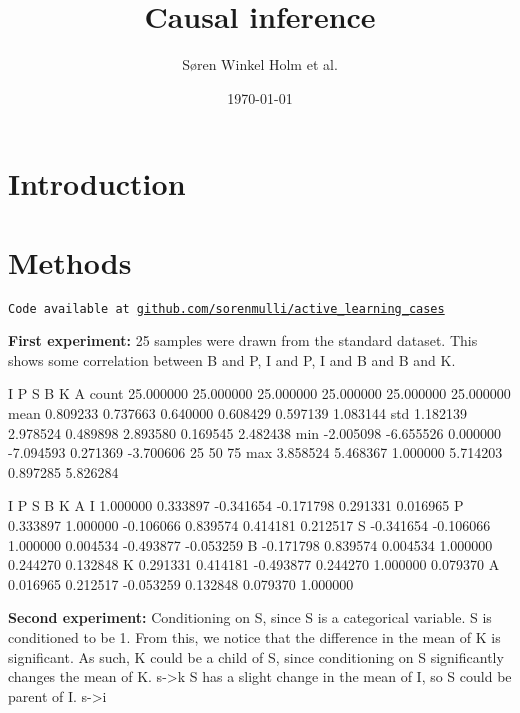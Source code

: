 \documentclass[12pt,fleqn,]{article}
\title{Causal inference }
\author{Søren Winkel Holm et al.}
\date{\today}
\begin{document}
\maketitle

\begin{abstract}

\end{abstract}

\begin{multicols}{2}
	
	
\section{Introduction} 
	
\section{Methods}
\texttt{Code available at \url{github.com/sorenmulli/active_learning_cases}} \newline


\textbf{First experiment:} 25 samples were drawn from the standard dataset. This shows some correlation between B and P, I and P, I and B and B and K.


            I          P          S          B          K          A
count  25.000000  25.000000  25.000000  25.000000  25.000000  25.000000
mean    0.809233   0.737663   0.640000   0.608429   0.597139   1.083144
std     1.182139   2.978524   0.489898   2.893580   0.169545   2.482438
min    -2.005098  -6.655526   0.000000  -7.094593   0.271369  -3.700606
25%
50%
75%
max     3.858524   5.468367   1.000000   5.714203   0.897285   5.826284

       I         P         S         B         K         A
I  1.000000  0.333897 -0.341654 -0.171798  0.291331  0.016965
P  0.333897  1.000000 -0.106066  0.839574  0.414181  0.212517
S -0.341654 -0.106066  1.000000  0.004534 -0.493877 -0.053259
B -0.171798  0.839574  0.004534  1.000000  0.244270  0.132848
K  0.291331  0.414181 -0.493877  0.244270  1.000000  0.079370
A  0.016965  0.212517 -0.053259  0.132848  0.079370  1.000000


\textbf{Second experiment:} Conditioning on S, since S is a categorical variable. S is conditioned to be 1. From this, we notice that the difference in the mean of K is significant. As such, K could be a child of S, since conditioning on S significantly changes the mean of K.
s->k
S has a slight change in the mean of I, so S could be parent of I.
s->i


\end{multicols}
\end{document}
